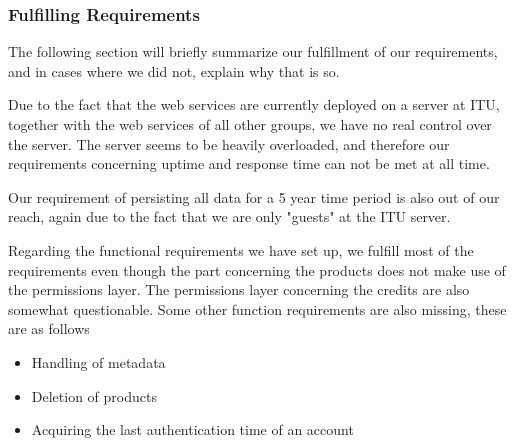 \subsubsection{Fulfilling Requirements}
\label{serverfulfil}
The following section will briefly summarize our fulfillment of our requirements, and in cases where we did not, explain why that is so.

Due to the fact that the web services are currently deployed on a server at ITU, together with the web services of all other groups, we have no real control over the server. The server seems to be heavily overloaded, and therefore our requirements concerning uptime and response time can not be met at all time.

Our requirement of persisting all data for a 5 year time period is also out of our reach, again due to the fact that we are only "guests" at the ITU server.

Regarding the functional requirements we have set up, we fulfill most of the requirements even though the part concerning the products does not make use of the permissions layer. The permissions layer concerning the credits are also somewhat questionable. 
Some other function requirements are also missing, these are as follows
\begin{itemize}
\item Handling of metadata
\item Deletion of products
\item Acquiring the last authentication time of an account
\end{itemize}


